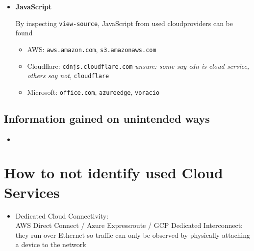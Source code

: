 \documentclass[12pt]{article}
\begin{document}
\begin{itemize}
    \item \textbf{JavaScript}
    
    By inspecting \verb|view-source|, JavaScript from used cloudproviders can be found
    \begin{itemize}
        \item AWS: \verb|aws.amazon.com|, \verb|s3.amazonaws.com|
        \item Cloudflare:
        \verb|cdnjs.cloudflare.com| \textit{unsure: some say cdn is cloud service, others say not}, \verb|cloudflare|
        \item Microsoft: \verb|office.com|, \verb|azureedge|, \verb|voracio|
    \end{itemize}
\end{itemize}

\subsection*{Information gained on unintended ways}
\begin{itemize}
    \item 
\end{itemize}


\newpage
\section*{How to not identify used Cloud Services}
\begin{itemize}
    \item Dedicated Cloud Connectivity: \\ AWS Direct Connect / Azure Expressroute / GCP Dedicated Interconnect: they run over Ethernet so traffic can only be observed by physically attaching a device to the network
\end{itemize}
\end{document}
